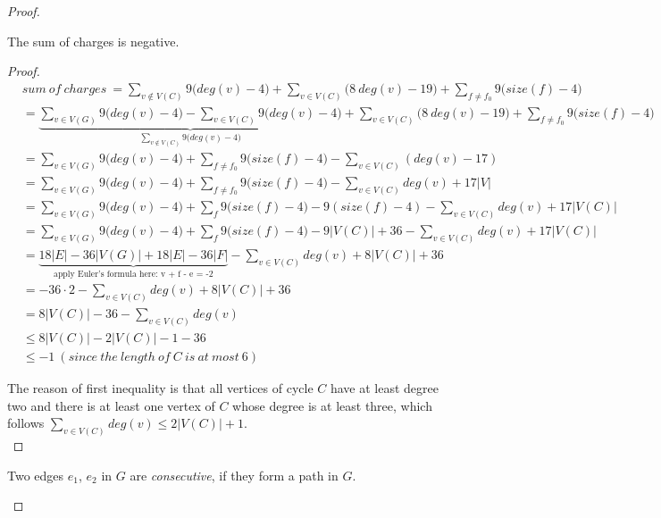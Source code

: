 \begin{proof}
\begin{claim}
The sum of charges is negative.
\end{claim}
\begin{proof}
\begin{align*}
    & sum \ of \ charges \ = \sum_{v \notin V(C)}9\big(deg(v) - 4\big) + \sum_{v \in V(C)} \big(8 \ deg(v) - 19\big) + \sum_{f \neq f_0}9\big(size(f) - 4\big) \\
    &= \underbrace{\sum_{v \in V(G)}9\big(deg(v) - 4\big) - \sum_{v \in V(C)}9\big(deg(v) - 4\big)}_{\sum_{v \notin V(C)}9\big(deg(v) - 4\big)} + \sum_{v \in V(C)} \big(8 \ deg(v) - 19\big) + \sum_{f \neq f_0}9\big(size(f) - 4\big) \\
    &= \sum_{v \in V(G)}9\big(deg(v) - 4\big) + \sum_{f \neq f_0}9\big(size(f) - 4\big) - \sum_{v \in V(C)}(deg(v) - 17)\\
    &= \sum_{v \in V(G)}9\big(deg(v) - 4\big) + \sum_{f \neq f_0}9\big(size(f) - 4\big) - \sum_{v \in V(C)}deg(v) + 17\left| V \right|\\
    &= \sum_{v \in V(G)}9\big(deg(v) - 4\big) + \sum_{f}9\big(size(f) - 4\big) - 9(size(f) - 4) - \sum_{v \in V(C)}deg(v) + 17\left| V(C) \right|\\
    &= \sum_{v \in V(G)}9\big(deg(v) - 4\big) + \sum_{f}9\big(size(f) - 4\big) - 9 \left| V(C) \right| + 36 - \sum_{v \in V(C)}deg(v) + 17\left| V(C) \right|\\
    &= \underbrace{18 \left| E \right| - 36\left| V(G) \right| + 18 \left| E \right| - 36 \left| F \right|}_{\text{apply Euler's formula here: v + f - e = -2}} - \sum_{v \in V(C)}deg(v) + 8 \left| V(C) \right| + 36 \\
    &= -36 \cdot 2 - \sum_{v \in V(C)}deg(v) + 8 \left| V(C) \right| + 36\\
    &= 8 \left| V(C) \right| - 36 - \sum_{v \in V(C)}deg(v)\\
    &\leq 8 \left| V(C) \right|- 2 \left| V(C) \right| - 1 - 36 \\
    &\leq -1 \ (since \ the \ length \ of \ C \ is \ at \ most \ 6)
\end{align*}

The reason of first inequality is that all vertices of cycle $C$ have at least degree two and there is at least one vertex of $C$ whose degree is at least three, which follows $\sum_{v \in V(C)}deg(v) \leq 2\left| V(C) \right| + 1$. \\
\end{proof}

\begin{definition}
Two edges $e_1$, $e_2$ in $G$ are \textit{consecutive}, if they form a path in $G$. \cite{BUJTAS2012561}
\end{definition}


\end{proof}
